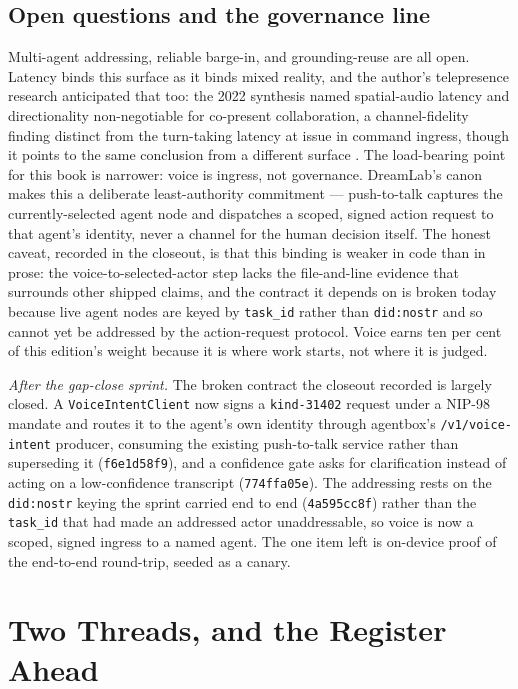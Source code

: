 \subsection{Open questions and the governance line}

Multi-agent addressing, reliable barge-in, and grounding-reuse are all open. Latency binds this surface as it binds mixed reality, and the author's telepresence research anticipated that too: the 2022 synthesis named spatial-audio latency and directionality non-negotiable for co-present collaboration, a channel-fidelity finding distinct from the turn-taking latency at issue in command ingress, though it points to the same conclusion from a different surface \parencite{OHare2022Convergence}. The load-bearing point for this book is narrower: voice is ingress, not governance. DreamLab's canon makes this a deliberate least-authority commitment --- push-to-talk captures the currently-selected agent node and dispatches a scoped, signed action request to that agent's identity, never a channel for the human decision itself. The honest caveat, recorded in the closeout, is that this binding is weaker in code than in prose: the voice-to-selected-actor step lacks the file-and-line evidence that surrounds other shipped claims, and the contract it depends on is broken today because live agent nodes are keyed by \texttt{task\_id} rather than \texttt{did:nostr} and so cannot yet be addressed by the action-request protocol. Voice earns ten per cent of this edition's weight because it is where work starts, not where it is judged.

\emph{After the gap-close sprint.} The broken contract the closeout recorded is largely closed. A \texttt{VoiceIntentClient} now signs a \texttt{kind-31402} request under a NIP-98 mandate and routes it to the agent's own identity through agentbox's \texttt{/v1/voice-intent} producer, consuming the existing push-to-talk service rather than superseding it (\texttt{f6e1d58f9}), and a confidence gate asks for clarification instead of acting on a low-confidence transcript (\texttt{774ffa05e}). The addressing rests on the \texttt{did:nostr} keying the sprint carried end to end (\texttt{4a595cc8f}) rather than the \texttt{task\_id} that had made an addressed actor unaddressable, so voice is now a scoped, signed ingress to a named agent. The one item left is on-device proof of the end-to-end round-trip, seeded as a canary.

\section{Two Threads, and the Register Ahead}

